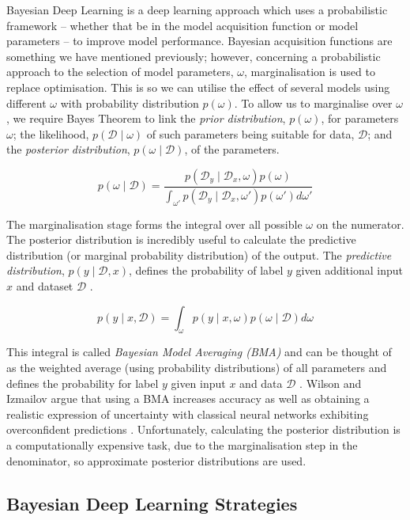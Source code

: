\documentclass[ %
                    author={James Stephenson},
                supervisor={Dr. Edwin Simpson},
                    degree={MSc},
                     title={Project Plan: Bayesian Deep Learning For Extractive Test Summarisation},
                  subtitle={},
                      type={},
                      year={2022}]{../additions/dissertation}
\begin{document}
			Bayesian Deep Learning is a deep learning approach which uses a probabilistic framework – whether that be in the model acquisition function or model parameters – to improve model performance. Bayesian acquisition functions are something we have mentioned previously; however, concerning a probabilistic approach to the selection of model parameters, $\omega$, marginalisation is used to replace optimisation. This is so we can utilise the effect of several models using different $\omega$ with probability distribution $p(\omega)$. To allow us to marginalise over $\omega$, we require Bayes Theorem to link the \emph{prior distribution}, $p(\omega)$, for parameters $\omega$; the likelihood, $p(\mathcal{D} \mid \omega)$ of such parameters being suitable for data, $\mathcal{D}$; and the \emph{posterior distribution}, $p(\omega \mid \mathcal{D})$, of the parameters.
		
		$$
			p(\omega \mid \mathcal{D}) = \frac{p(\mathcal{D}_y \mid  \mathcal{D}_x, \omega)p(\omega)}{\int_{\omega'} p( \mathcal{D}_y \mid  \mathcal{D}_x, \omega')p(\omega')d\omega'}
		$$
	
		\noindent
		The marginalisation stage forms the integral over all possible $\omega$ on the numerator. The posterior distribution is incredibly useful to calculate the predictive distribution (or marginal probability distribution) of the output. The \emph{predictive distribution}, $p(y \mid \mathcal{D}, x)$, defines the probability of label $y$ given additional input $x$ and dataset  $\mathcal{D}$ \cite{Izmailov20}.
		
		$$
			p(y \mid x,  \mathcal{D}) = \int_\omega p(y \mid x, \omega)p(\omega \mid  \mathcal{D}) d\omega
		$$
		
		\noindent
		This integral is called \emph{Bayesian Model Averaging (BMA)} and can be thought of as the weighted average (using probability distributions) of all parameters and defines the probability for label $y$ given input $x$ and data $\mathcal{D}$ \cite{Izmailov20}. Wilson and Izmailov \cite{Izmailov20} argue that using a BMA increases accuracy as well as obtaining a realistic expression of uncertainty with classical neural networks exhibiting overconfident predictions \cite{Xu19}. Unfortunately, calculating the posterior distribution is a computationally expensive task, due to the marginalisation step in the denominator, so approximate posterior distributions are used.
		
			\subsection{Bayesian Deep Learning Strategies}
			\label{chap:literaturereview:deepbayes:strategies}
			
\end{document}
